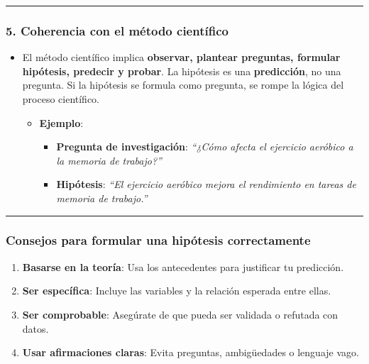 \documentclass[
]{article}
\providecommand{\tightlist}{%
  \setlength{\itemsep}{0pt}\setlength{\parskip}{0pt}}\usepackage{longtable,booktabs,array}
\begin{document}
\begin{tcolorbox}
\begin{center}\rule{0.5\linewidth}{0.5pt}\end{center}

\subsubsection{\texorpdfstring{\textbf{5. Coherencia con el método
científico}}{5. Coherencia con el método científico}}\label{coherencia-con-el-muxe9todo-cientuxedfico}

\begin{itemize}
\tightlist
\item
  El método científico implica \textbf{observar, plantear preguntas,
  formular hipótesis, predecir y probar}. La hipótesis es una
  \textbf{predicción}, no una pregunta. Si la hipótesis se formula como
  pregunta, se rompe la lógica del proceso científico.

  \begin{itemize}
  \tightlist
  \item
    \textbf{Ejemplo}:

    \begin{itemize}
    \tightlist
    \item
      \textbf{Pregunta de investigación}: \emph{``¿Cómo afecta el
      ejercicio aeróbico a la memoria de trabajo?''}\\
    \item
      \textbf{Hipótesis}: \emph{``El ejercicio aeróbico mejora el
      rendimiento en tareas de memoria de trabajo.''}
    \end{itemize}
  \end{itemize}
\end{itemize}

\begin{center}\rule{0.5\linewidth}{0.5pt}\end{center}

\subsubsection{\texorpdfstring{\textbf{Consejos para formular una
hipótesis
correctamente}}{Consejos para formular una hipótesis correctamente}}\label{consejos-para-formular-una-hipuxf3tesis-correctamente}

\begin{enumerate}
\def\labelenumi{\arabic{enumi}.}
\tightlist
\item
  \textbf{Basarse en la teoría}: Usa los antecedentes para justificar tu
  predicción.\\
\item
  \textbf{Ser específica}: Incluye las variables y la relación esperada
  entre ellas.\\
\item
  \textbf{Ser comprobable}: Asegúrate de que pueda ser validada o
  refutada con datos.\\
\item
  \textbf{Usar afirmaciones claras}: Evita preguntas, ambigüedades o
  lenguaje vago.
\end{enumerate}


\end{tcolorbox}
\end{document}
